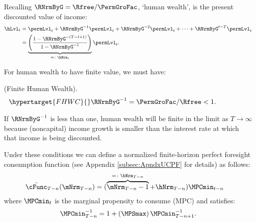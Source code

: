 \documentclass[\econtexRoot/BufferStockTheory]{subfiles}
\begin{document}
Recalling $\RNrmByG  = \Rfree/\PermGroFac$, `human wealth', is the present discounted value of income:
%
% 
\begin{equation}\begin{gathered}\begin{aligned}
  \hLvl_{t}  & = \permLvl_{t}+\RNrmByG^{-1} \permLvl_{t} + \RNrmByG^{-2} \permLvl_{t} + \cdots + \RNrmByG^{t-T} \permLvl_{t} \notag
  \\  & = \underbrace{\left(\frac{1-\RNrmByG^{-(T-t+1)}}{1-\RNrmByG^{-1}}\right)}_{ = \colon \hNrm_{t}}\permLvl_{t} \label{eq:HDef}.
\end{aligned}\end{gathered}\end{equation}

For human wealth to have finite value, we must have:
%
\begin{assumI}\label{ass:FHWC}(Finite Human Wealth).
\begin{equation}\begin{gathered}\begin{aligned}\hypertarget{FHWC}{}
   \RNrmByG^{-1} = \PermGroFac/\Rfree  & < 1. \phantom{\text{{\FHWC}:~~}}\label{eq:FHWC2}
\end{aligned}\end{gathered}\end{equation}
\end{assumI}
%
If $\RNrmByG^{-1}$ is less than one, human wealth will be finite in the limit as $T \rightarrow \infty$ because (noncapital) income growth is smaller than the interest rate at which that income is being discounted.

Under these conditions we can define a normalized finite-horizon perfect foresight consumption function (see Appendix \ref{subsec:ApndxUCPF} for details) as follows:\hypertarget{MPCminDefn}{}
%
\begin{equation}\begin{gathered}\begin{aligned}
  \bar{\cFunc}_{T-n}(\mNrm_{T-n})  & = (\overbrace{\mNrm_{T-n}-1}^{
                                     = \colon  \bNrm_{T-n}}+\hNrm_{T-n})\MPCmin_{t-n}
\end{aligned}\end{gathered}\end{equation}
%
where $\MPCmin_{t}$ is the marginal propensity to consume (MPC) and satisfies:
%
\begin{equation}\begin{gathered}\begin{aligned}\label{eq:PFMPCminInv}
\MPCmin_{T-n}^{-1}  = 1+\left(\MPSmax\right) \MPCmin_{T-n+1}^{-1}.
\end{aligned}\end{gathered}\end{equation}
%
\end{document}
